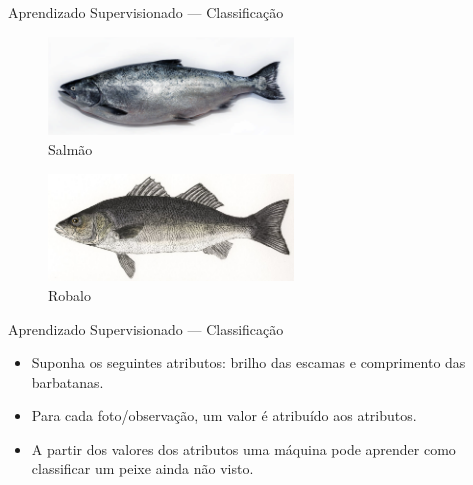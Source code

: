 \documentclass{libs/ufc_format}
\begin{document}
\begin{frame}{Aprendizado Supervisionado  --- Classificação}
    \begin{figure}
        \centering
        \includegraphics[width=6.5cm]{media/salmon}
        \caption{Salmão}
        \label{fSalmao}
    \end{figure}
    \vspace{-0.5cm}
    \begin{figure}
        \centering
        \includegraphics[width=6.5cm]{media/seabass}
        \caption{Robalo}
        \label{fRobalo}
    \end{figure}
\end{frame}

\begin{frame}{Aprendizado Supervisionado  --- Classificação}
    \begin{itemize}
        \justifying
        \item Suponha os seguintes atributos: brilho das escamas e comprimento das barbatanas.
        \item Para cada foto/observação, um valor é atribuído aos atributos.
        \item A partir dos valores dos atributos uma máquina pode aprender como classificar um peixe ainda não visto.
    \end{itemize}
\end{frame}

\end{document}
